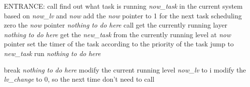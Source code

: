 \documentclass{standalone}
\begin{document}
\begin{algorithm}[H]
  \SetAlgoLined

  ENTRANCE: call \taskSwitch{}\;
  \myproc{\taskSwitch{}}
  {
    find out what task is running \emph{now\_task} in the current system based on
    \emph{now\_lv} and \emph{now}\;
    add the \emph{now} pointer to 1 for the next task scheduling\;
    {
      zero the \emph{now} pointer\;
    }
    {
      \emph{nothing to do here}\;
    }
    {
      call \taskSwitchSub{}\;
      get the currently running layer\;
    }
    {
      \emph{nothing to do here}\;
    }
    get the \emph{new\_task} from the currently running level at \emph{now} pointer\;
    set the timer of the task according to the priority of the task\;
    {
      jump to \emph{new\_task} run\;
    }
    {
      \emph{nothing to do here}\;
    }
  }

  \myproc{\taskSwitchSub{}}
  {
    {
      {
        break\;
      }
      {
        \emph{nothing to do here}\;
      }
    }
    modify the current running level \emph{now\_lv} to i\;
    modify the \emph{lv\_change} to 0, so the next time don't need to call \taskSwitchSub{}\;
  }



\end{algorithm}
\end{document}
